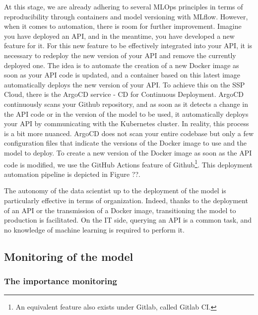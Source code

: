
At this stage, we are already adhering to several MLOps principles in terms of reproducibility through containers and model versioning with MLflow. However, when it comes to automation, there is room for further improvement. Imagine you have deployed an API, and in the meantime, you have developed a new feature for it. For this new feature to be effectively integrated into your API, it is necessary to redeploy the new version of your API and remove the currently deployed one. The idea is to automate the creation of a new Docker image as soon as your API code is updated, and a container based on this latest image automatically deploys the new version of your API. To achieve this on the SSP Cloud, there is the ArgoCD service - CD for Continuous Deployment. ArgoCD continuously scans your Github repository, and as soon as it detects a change in the API code or in the version of the model to be used, it automatically deploys your API by communicating with the Kubernetes cluster. In reality, this process is a bit more nuanced. ArgoCD does not scan your entire codebase but only a few configuration files that indicate the versions of the Docker image to use and the model to deploy. To create a new version of the Docker image as soon as the API code is modified, we use the GitHub Actions feature of Github\footnote{An equivalent feature also exists under Gitlab, called Gitlab CI.}. This deployment automation pipeline is depicted in Figure ??.

The autonomy of the data scientist up to the deployment of the model is particularly effective in terms of organization. Indeed, thanks to the deployment of an API or the transmission of a Docker image, transitioning the model to production is facilitated. On the IT side, querying an API is a common task, and no knowledge of machine learning is required to perform it.

\subsection{Monitoring of the model}

\subsubsection{The importance monitoring}

